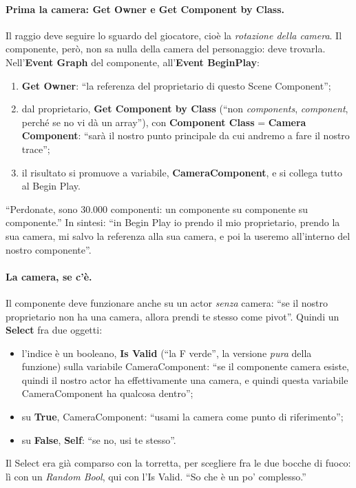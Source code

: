 \paragraph{Prima la camera: Get Owner e Get Component by Class.} Il raggio deve seguire lo
sguardo del giocatore, cioè la \emph{rotazione della camera}. Il componente, però, non sa
nulla della camera del personaggio: deve trovarla. Nell'\textbf{Event Graph} del
componente, all'\textbf{Event BeginPlay}:
\begin{enumerate}
  \item \textbf{Get Owner}: ``la referenza del proprietario di questo Scene Component'';
  \item dal proprietario, \textbf{Get Component by Class} (``non \emph{components},
        \emph{component}, perché se no vi dà un array''), con \textbf{Component Class} =
        \textbf{Camera Component}: ``sarà il nostro punto principale da cui andremo a fare il
        nostro trace'';
  \item il risultato si promuove a variabile, \textbf{CameraComponent}, e si collega tutto
        al Begin Play.
\end{enumerate}
``Perdonate, sono 30.000 componenti: un componente su componente su componente.'' In
sintesi: ``in Begin Play io prendo il mio proprietario, prendo la sua camera, mi salvo la
referenza alla sua camera, e poi la useremo all'interno del nostro componente''.

\paragraph{La camera, se c'è.} Il componente deve funzionare anche su un actor
\emph{senza} camera: ``se il nostro proprietario non ha una camera, allora prendi te stesso
come pivot''. Quindi un \textbf{Select} fra due oggetti:
\begin{itemize}
  \item l'indice è un booleano, \textbf{Is Valid} (``la F verde'', la versione \emph{pura}
        della funzione) sulla variabile CameraComponent: ``se il componente camera esiste,
        quindi il nostro actor ha effettivamente una camera, e quindi questa variabile
        CameraComponent ha qualcosa dentro'';
  \item su \textbf{True}, CameraComponent: ``usami la camera come punto di riferimento'';
  \item su \textbf{False}, \textbf{Self}: ``se no, usi te stesso''.
\end{itemize}
Il Select era già comparso con la torretta, per scegliere fra le due bocche di fuoco: lì
con un \emph{Random Bool}, qui con l'Is Valid. ``So che è un po' complesso.''

